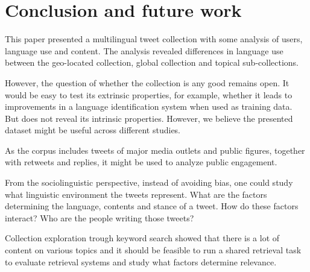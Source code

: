\documentclass{IOS-Book-Article}
\begin{document}


\section{Conclusion and future work}
\label{sec:conclusion}


This paper presented a multilingual tweet collection with some analysis of users, language use and content. The analysis revealed differences in language use between the geo-located collection, global collection and topical sub-collections.

However, the question of whether the collection is any good remains open. It would be easy to test its extrinsic properties, for example, whether it leads to improvements in a language identification system when used as training data. But does not reveal its intrinsic properties. However, we believe the presented dataset might be useful across different studies.

As the corpus includes tweets of major media outlets and public figures, together with retweets and replies, it might be used to analyze public engagement.

From the sociolinguistic perspective, instead of avoiding bias, one could study what linguistic environment the tweets represent. What are the factors determining the language, contents and stance of a tweet. How do these factors interact? Who are the people writing those tweets?

Collection exploration trough keyword search showed that there is a lot of content on various topics and it should be feasible to run a shared retrieval task to evaluate retrieval systems and study what factors determine relevance.






\end{document}
